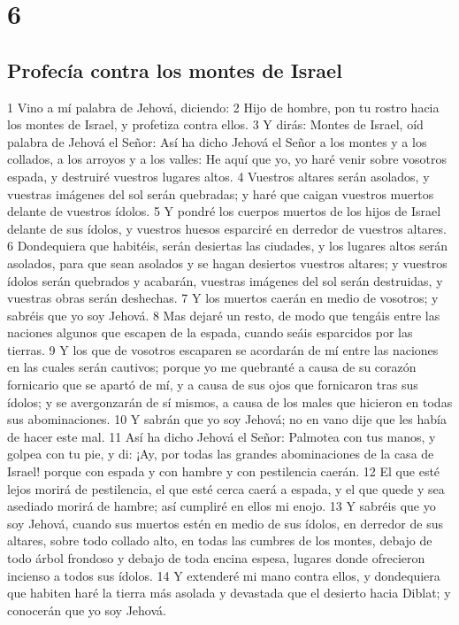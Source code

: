 \chapter{6}

\section*{Profecía contra los montes de Israel}

1 Vino a mí palabra de Jehová, diciendo:
2 Hijo de hombre, pon tu rostro hacia los montes de Israel, y profetiza contra ellos.
3 Y dirás: Montes de Israel, oíd palabra de Jehová el Señor: Así ha dicho Jehová el Señor a los montes y a los collados, a los arroyos y a los valles: He aquí que yo, yo haré venir sobre vosotros espada, y destruiré vuestros lugares altos.
4 Vuestros altares serán asolados, y vuestras imágenes del sol serán quebradas; y haré que caigan vuestros muertos delante de vuestros ídolos.
5 Y pondré los cuerpos muertos de los hijos de Israel delante de sus ídolos, y vuestros huesos esparciré en derredor de vuestros altares.
6 Dondequiera que habitéis, serán desiertas las ciudades, y los lugares altos serán asolados, para que sean asolados y se hagan desiertos vuestros altares; y vuestros ídolos serán quebrados y acabarán, vuestras imágenes del sol serán destruidas, y vuestras obras serán deshechas.
7 Y los muertos caerán en medio de vosotros; y sabréis que yo soy Jehová.
8 Mas dejaré un resto, de modo que tengáis entre las naciones algunos que escapen de la espada, cuando seáis esparcidos por las tierras.
9 Y los que de vosotros escaparen se acordarán de mí entre las naciones en las cuales serán cautivos; porque yo me quebranté a causa de su corazón fornicario que se apartó de mí, y a causa de sus ojos que fornicaron tras sus ídolos; y se avergonzarán de sí mismos, a causa de los males que hicieron en todas sus abominaciones.
10 Y sabrán que yo soy Jehová; no en vano dije que les había de hacer este mal.
11 Así ha dicho Jehová el Señor: Palmotea con tus manos, y golpea con tu pie, y di: ¡Ay, por todas las grandes abominaciones de la casa de Israel! porque con espada y con hambre y con pestilencia caerán.
12 El que esté lejos morirá de pestilencia, el que esté cerca caerá a espada, y el que quede y sea asediado morirá de hambre; así cumpliré en ellos mi enojo.
13 Y sabréis que yo soy Jehová, cuando sus muertos estén en medio de sus ídolos, en derredor de sus altares, sobre todo collado alto, en todas las cumbres de los montes, debajo de todo árbol frondoso y debajo de toda encina espesa, lugares donde ofrecieron incienso a todos sus ídolos.
14 Y extenderé mi mano contra ellos, y dondequiera que habiten haré la tierra más asolada y devastada que el desierto hacia Diblat; y conocerán que yo soy Jehová.

